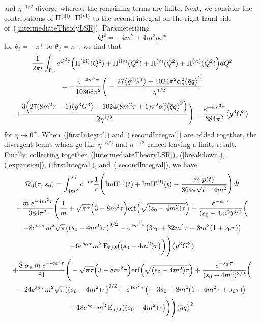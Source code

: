 \documentclass[11pt, letterpaper]{article}
\newcommand{\lsr}{\mathcal{R}_{0}}
\newcommand{\double}[2]{(#1,\,#2)}
\newcommand{\dif}[1]{d #1}
\newcommand{\glueSixD}{\big\langle g^{3} G^{3} \big\rangle}
\newcommand{\rom}[1]{\uppercase\expandafter{\romannumeral #1\relax}}
\begin{document}
and $\eta^{-1/2}$ diverge whereas the remaining terms are finite.
Next, we consider the contributions of $\Pi^{\text{(\rom{3})}}$--$\Pi^{\text{(\rom{6})}}$
to the second integral on the right-hand side of~(\ref{intermediateTheoryLSR}).
Parameterizing 
\begin{equation}
  Q^2=-4m^2+4m^2 \eta e^{i\theta}
\end{equation}
for $\theta_i=-\pi^{+}$ to $\theta_f=\pi^{-}$, we find that
%
\begin{multline}\label{secondIntegral}
  \frac{1}{2\pi i}\int_{\Gamma_{\eta}} e^{Q^2 \tau} \Big(
    \Pi^{\text{(\rom{3})}}(Q^2) + \Pi^{\text{(\rom{4})}}(Q^2) + \Pi^{\text{(\rom{5})}}(Q^2) + \Pi^{\text{(\rom{6})}}(Q^2) \Big) \dif{Q^2} \\
  = - \frac{e^{-4m^2 \tau}}{10368\pi^2}
  \Bigg(-\frac{27 \glueSixD + 1024 \pi^2 \alpha_s^2 \big\langle \overline{q}q \big\rangle^2}{\eta^{3/2}} \\
   +\frac{3\Big(27 (8m^2 \tau -1) \glueSixD + 1024 (8m^2 \tau +1) \pi^2 \alpha_s^2 \big\langle \overline{q}q \big\rangle^2 \Big)}{2 \eta^{1/2}}\Bigg)
  + \frac{e^{-4m^2 \tau}}{384\pi^2} \glueSixD
\end{multline}
%
for $\eta\rightarrow 0^{+}$.
When~(\ref{firstIntegral}) and~(\ref{secondIntegral}) are added together,
the divergent terms which go like $\eta^{-3/2}$ and $\eta^{-1/2}$ cancel
leaving a finite result.
Finally, collecting together~(\ref{intermediateTheoryLSR}),
(\ref{breakdown}), (\ref{expansion}), (\ref{firstIntegral}),
and~(\ref{secondIntegral}), we have
%
\begin{multline}\label{finalTheoryLSR}
  \lsr\double{\tau}{s_0}=\int_{4m^2}^{s_0}e^{-t\tau}\frac{1}{\pi}
    \Bigg(\text{Im}\Pi^{\text{(\rom{1})}}(t)+\text{Im}\Pi^{\text{(\rom{2})}}(t)
-\frac{m \; p(t)}{864\pi\sqrt{t-4m^2}} 
  \Bigg)
    \dif{t}
    \\
 +\frac{m \; e^{-4m^2 \tau}}{384\pi^2}
  \Bigg(
  \frac{1}{m} + \sqrt{\pi\tau} \Big( 3 - 8m^2 \tau \Big) \mathrm{erf}\Big(\sqrt{(s_0-4m^2)\tau}\Big) + \frac{e^{-s_0 \, \tau}}{(s_0 - 4m^2)^{3/2}} \bigg( \\
  -8 e^{s_0 \, \tau} m^2 \sqrt{\pi} \big((s_0 - 4m^2) \tau \big)^{3/2} + e^{4m^2 \, \tau} \big( 3 s_0 +32 m^4 \tau -8 m^2 (1+s_0 \tau)\big) \\
 +6 e^{s_0 \, \tau} m^2 \, \mathrm{E}_{5/2}\big( (s_0 -4m^2) \tau \big)
  \bigg)
  \Bigg)\glueSixD \\
 +\frac{8 \; \alpha_s \; m \; e^{-4m^2 \tau}}{81}
  \Bigg(
- \sqrt{\pi\tau} \Big( 3 - 8m^2 \tau \Big) \mathrm{erf}\Big(\sqrt{(s_0-4m^2)\tau}\Big) + \frac{e^{-s_0 \, \tau}}{(s_0 - 4m^2)^{3/2}} \bigg( \\
  -24 e^{s_0 \, \tau} m^2 \sqrt{\pi} \big((s_0 - 4m^2) \tau \big)^{3/2} + e^{4m^2 \, \tau} \big( -3 s_0 +8 m^2 (1 - 4m^2 \tau +s_0 \tau)\big) \\
   +18 e^{s_0 \, \tau} m^2 \, \mathrm{E}_{5/2}\big( (s_0 -4m^2) \tau \big) 
  \bigg)
  \Bigg)\big\langle \overline{q}q \big\rangle^2
\end{multline}
\end{document}
